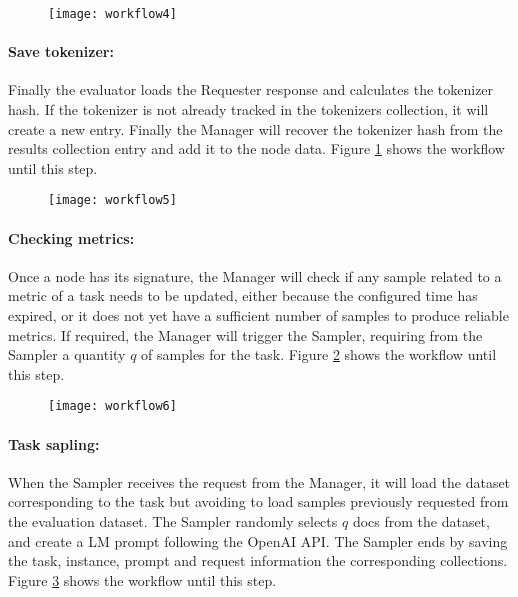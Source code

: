 \begin{figure}[H]
    \centering        
    \texttt{[image: workflow4]}
    \caption{}
    \label{secb:fig:wf4}
\end{figure}


\paragraph{Save tokenizer:}
Finally the evaluator loads the Requester response and calculates the tokenizer hash. If the tokenizer is not already tracked in the tokenizers collection, it will create a new entry. Finally the Manager will recover the tokenizer hash from the results collection entry and add it to the node data. Figure \ref{secb:fig:wf4} shows the workflow until this step.

\begin{figure}[H]
    \centering
    \texttt{[image: workflow5]}
    \caption{}
    \label{secb:fig:wf5}
\end{figure}


\paragraph{Checking metrics:}
Once a node has its signature, the Manager will check if any sample related to a metric of a task needs to be updated, either because the configured time has expired, or it does not yet have a sufficient number of samples to produce reliable metrics. 
If required, the Manager will trigger the Sampler, requiring from the Sampler a quantity $q$ of samples for the task. 
Figure \ref{secb:fig:wf5} shows the workflow until this step.


\begin{figure}[H]
    \centering
    \texttt{[image: workflow6]}
    \caption{}
    \label{secb:fig:wf6}
\end{figure}

\paragraph{Task sapling:}
When the Sampler receives the request from the Manager, it will load the dataset corresponding to the task but avoiding to load samples previously requested from the evaluation dataset. 
The Sampler randomly selects $q$ docs from the dataset, and create a \gls{LM} prompt following the OpenAI API. The Sampler ends by saving the task, instance, prompt and request information the corresponding collections.
Figure \ref{secb:fig:wf6} shows the workflow until this step.

